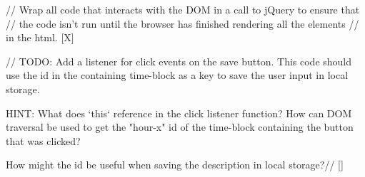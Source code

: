 // Wrap all code that interacts with the DOM in a call to jQuery to ensure that
// the code isn't run until the browser has finished rendering all the elements
// in the html. [X]


// TODO: Add a listener for click events on the save button. 
This code should use the id in the containing time-block as a key to save the user input in local storage.

HINT: What does `this` reference in the click listener function? 
How can DOM traversal be used to get the "hour-x" id of the time-block containing the button that was clicked? 

How might the id be useful when saving the description in local storage?// []